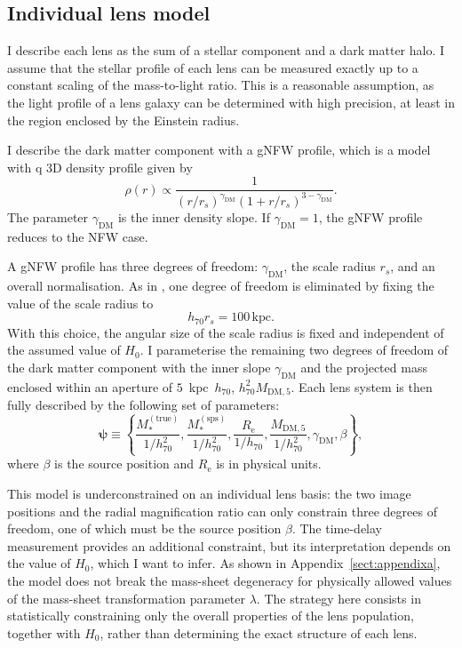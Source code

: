 \documentclass{aa}
\def\hseventy{h_{70}}
\def\mstartrue{M_*^{\mathrm{(true)}}}
\def\msps{M_*^{\mathrm{(sps)}}}
\def\mfive{M_{\mathrm{DM},5}}
\def\gammadm{\gamma_{\mathrm{DM}}}
\def\reff{R_{\mathrm{e}}}
\def\indpar{\boldsymbol{\psi}}
\begin{document}
\subsection{Individual lens model}\label{ssec:individ}

I describe each lens as the sum of a stellar component and a dark matter halo. I assume that the stellar profile of each lens can be measured exactly up to a constant scaling of the mass-to-light ratio. 
This is a reasonable assumption, as the light profile of a lens galaxy can be determined with high precision, at least in the region enclosed by the Einstein radius.

I describe the dark matter component with a gNFW profile, which is a model with q 3D density profile given by
\begin{equation}
\rho(r) \propto \frac{1}{(r/r_s)^{\gammadm}\left(1 + r/r_s\right)^{3-\gammadm}}.
\end{equation}
The parameter $\gammadm$ is the inner density slope. If $\gammadm=1$, the gNFW profile reduces to the NFW case.

A gNFW profile has three degrees of freedom: $\gammadm$, the scale radius $r_s$, and an overall normalisation. As in ,  one degree of freedom is eliminated by fixing the value of the scale radius to
\begin{equation}
\hseventy r_s = 100\,\mathrm{kpc}.
\end{equation}
With this choice, the angular size of the scale radius is fixed and independent of the assumed value of $H_0$.
I parameterise the remaining two degrees of freedom of the dark matter component with the inner slope $\gammadm$ and the projected mass enclosed within an aperture of $5$~kpc~$\hseventy$, $\hseventy^2\mfive$.
Each lens system is then fully described by the following set of parameters: 
\begin{equation}
\indpar \equiv \left\{\frac{\mstartrue}{1/\hseventy^2}, \frac{\msps}{1/\hseventy^2}, \frac{\reff}{1/\hseventy}, \frac{\mfive}{1/\hseventy^2}, \gammadm, \beta \right\},
\end{equation}
where $\beta$ is the source position and $\reff$ is in physical units.

This model is underconstrained on an individual lens basis: the two image positions and the radial magnification ratio can only constrain three degrees of freedom, one of which must be the source position $\beta$. The time-delay measurement provides an additional constraint, but its interpretation depends on the value of $H_0$, which I want to infer.
As shown in Appendix~\ref{sect:appendixa}, the model does not break the mass-sheet degeneracy for physically allowed values of the mass-sheet transformation parameter $\lambda$.
The strategy here consists in statistically constraining only the overall properties of the lens population, together with $H_0$, rather than determining the exact structure of each lens.
\end{document}
